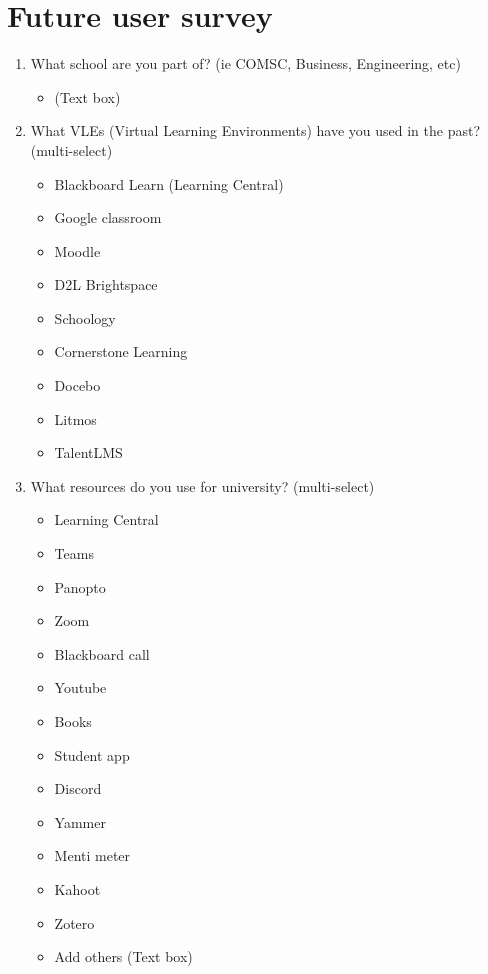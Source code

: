 \section{Future user survey}
\begin{enumerate}
    \item What school are you part of? (ie COMSC, Business, Engineering, etc)
    \begin{itemize}
	\item (Text box)
    \end{itemize}
    
    \item What VLEs (Virtual Learning Environments) have you used in the past? (multi-select)
    \begin{itemize}
        \item Blackboard Learn (Learning Central)
        \item Google classroom
        \item Moodle
	\item D2L Brightspace
        \item Schoology
        \item Cornerstone Learning
        \item Docebo
        \item Litmos
        \item TalentLMS
    \end{itemize}
    
    \item What resources do you use for university? (multi-select)
    \begin{itemize}
        \item Learning Central
        \item Teams
        \item Panopto
        \item Zoom
        \item Blackboard call
        \item Youtube
        \item Books
        \item Student app
        \item Discord
        \item Yammer
        \item Menti meter
        \item Kahoot
        \item Zotero 
        \item Add others (Text box) 
    \end{itemize}
    

\end{enumerate}
